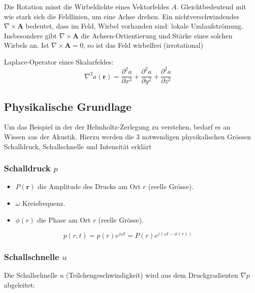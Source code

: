 Die Rotation misst die Wirbeldichte eines Vektorfeldes $A$. Gleichtbedeutend mit wie stark sich die Feldlinien, um eine Achse drehen. Ein nichtverschwindendes $\nabla\times \mathbf{A}$ bedeutet, dass im Feld, Wirbel vorhanden sind: lokale Umlaufströmung. Insbesondere gibt $\nabla\times \mathbf{A}$ die Achsen-Ortientierung und Stärke eines solchen Wirbels an. Ist $\nabla\times \mathbf{A}=0$, so ist das Feld wirbelfrei (irrotational) \newline


Laplace-Operator eines Skalarfeldes:
\begin{equation}
\nabla^2 a(\mathbf{r}) = \frac{\partial^2 a}{\partial x^2} + \frac{\partial^2 a}{\partial y^2} + \frac{\partial^2 a}{\partial z^2}
\end{equation}


\subsection{Physikalische Grundlage}

Um das Beispiel in der der Helmholtz-Zerlegung zu verstehen, bedarf es an Wissen aus der Akustik. Hierzu werden die 3 notwendigen physikalischen Grössen Schalldruck, Schallschnelle und Intensität erklärt


\subsubsection{Schalldruck $p$}
\begin{itemize}
\item $P(\mathbf{r})$ die Amplitude des Drucks am Ort $r$ (reelle Grösse).
\item $\omega$ Kreisfrequenz.
\item $\phi (r)$ die Phase am Ort $r$ (reelle Grösse).
\end{itemize}

\begin{equation}
p(r,t) = p(r)e^{j \omega t} = P(r)e^{j( \omega t - \phi(r))}
\end{equation}

\subsubsection{Schallschnelle  $u$}
Die Schallschnelle $u$ (Teilchengeschwindigkeit) wird aus dem Druckgradienten $\nabla p$ abgeleitet:  

